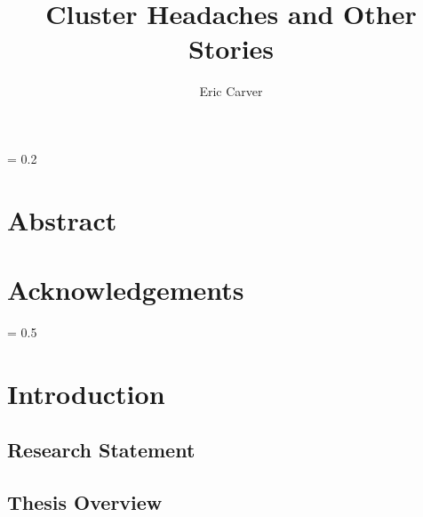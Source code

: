 \documentclass[a4paper]{article}
\title{
    \vspace{2in}
    \textbf{Cluster Headaches and Other Stories \\}
    \vspace{2in}
}
\author{Eric Carver}
\affil{carverer@mail.uc.edu}
\affil{(513) 207-6501}
\begin{document}
%
\maketitle
\thispagestyle{empty}
\newpage
\thispagestyle{empty}
\parskip = 0.2\baselineskip
\newpage
\thispagestyle{empty}
\section*{\textbf{Abstract}}
\newpage
\thispagestyle{empty}
\section*{\textbf{Acknowledgements}}
\newpage
\thispagestyle{empty}
\tableofcontents
\newpage
\thispagestyle{empty}
\listoffigures
\listoftables
\parskip = 0.5\baselineskip
\newpage

\section{\textbf{Introduction}}


\subsection{\textbf{Research Statement}}

\subsection{\textbf{Thesis Overview}}


\end{document}
